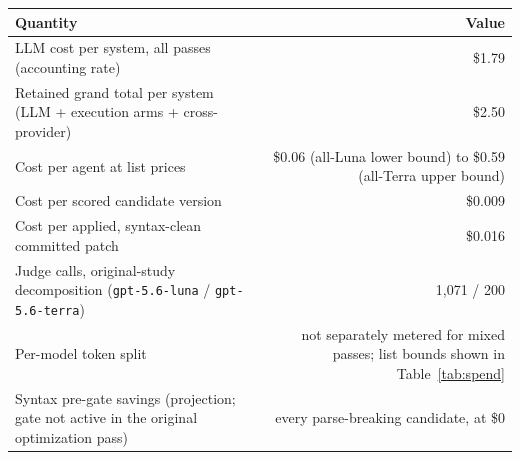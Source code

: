 \begin{tabular}{lr}
\toprule
Quantity & Value \\
\midrule
LLM cost per system, all passes (accounting rate) & \$1.79 \\
Retained grand total per system (LLM + execution arms + cross-provider) & \$2.50 \\
Cost per agent at list prices & \$0.06 (all-Luna lower bound) to \$0.59 (all-Terra upper bound) \\
Cost per scored candidate version & \$0.009 \\
Cost per applied, syntax-clean committed patch & \$0.016 \\
Judge calls, original-study decomposition (\texttt{gpt-5.6-luna} / \texttt{gpt-5.6-terra}) & 1,071 / 200 \\
Per-model token split & not separately metered for mixed passes; list bounds shown in Table~\ref{tab:spend} \\
Syntax pre-gate savings (projection; gate not active in the original optimization pass) & every parse-breaking candidate, at \$0 \\
\bottomrule
\end{tabular}
